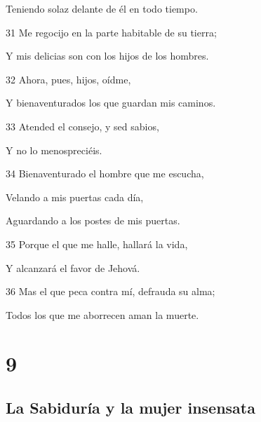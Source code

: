 \par Teniendo solaz delante de él en todo tiempo.
\par 31 Me regocijo en la parte habitable de su tierra;
\par Y mis delicias son con los hijos de los hombres.
\par 32 Ahora, pues, hijos, oídme,
\par Y bienaventurados los que guardan mis caminos.
\par 33 Atended el consejo, y sed sabios,
\par Y no lo menospreciéis.
\par 34 Bienaventurado el hombre que me escucha,
\par Velando a mis puertas cada día,
\par Aguardando a los postes de mis puertas. 
\par 35 Porque el que me halle, hallará la vida,
\par Y alcanzará el favor de Jehová.
\par 36 Mas el que peca contra mí, defrauda su alma;
\par Todos los que me aborrecen aman la muerte. 

\chapter{9}

\section*{La Sabiduría y la mujer insensata}

